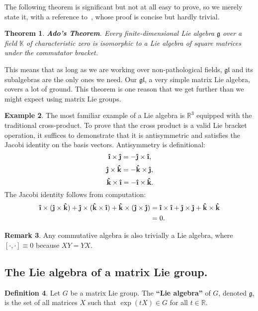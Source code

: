 \documentclass[12pt]{article}
\newcommand{\R}{\mathbb{R}}
\newcommand{\K}{\mathbb{K}}
\newcommand{\g}{\mathfrak{g}}
\newcommand{\gl}{\mathfrak{gl}}
\newcommand{\ihat}{\boldsymbol{\hat{\textbf{\i}}}}
\newcommand{\jhat}{\boldsymbol{\hat{\textbf{\j}}}}
\newcommand{\khat}{\boldsymbol{\hat{\textbf{k}}}}
\newtheorem{them}{Theorem}[section]
\theoremstyle{definition}
\theoremstyle{definition}
\theoremstyle{definition}
\theoremstyle{definition}
\newtheorem{rmk}[them]{Remark}
\theoremstyle{definition}
\newtheorem{defn}[them]{Definition}
\theoremstyle{definition}
\newtheorem{ex}[them]{Example}
\theoremstyle{definition}
\theoremstyle{definition}
\begin{document}
\par{The following theorem is significant but
not at all easy to prove, so we merely
state it, with a reference to~\cite{Neretin},
whose proof is concise but hardly trivial.}

\begin{them}\label{them:ado}
\textbf{Ado’s Theorem}.
Every finite-dimensional Lie algebra $\g$
over a field $\K$ of characteristic zero is
isomorphic to a Lie algebra of square matrices under
the commutator bracket.
\end{them}

\par{This means that as long as we are working
over non-pathological fields, $\gl$ and its
subalgebras are the only ones we need. Our $\gl$,
a very simple matrix Lie algebra, covers a lot of
ground. This theorem is one reason that we get
further than we might expect using matrix Lie
groups.}

\begin{ex}
The most familiar example of a Lie algebra is
$\R^3$ equipped with the traditional
cross-product. To prove that the cross product is
a valid Lie bracket operation, it suffices to
demonstrate that it is antisymmetric and satisfies
the Jacobi identity on the basis vectors.
Antisymmetry is definitional:
\[\ihat \times \jhat = - \jhat \times \ihat,\]
\[\jhat \times \khat = - \khat \times \jhat,\]
\[\khat \times \ihat = - \ihat \times \khat.\] 
The Jacobi identity follows from computation: 
\[
\begin{aligned}
    \ihat \times (\jhat \times \khat) + \jhat
    \times (\khat \times \ihat) + \khat \times
    (\jhat \times \jhat)
    & = \ihat \times \ihat +
    \jhat \times \jhat + \khat \times \khat \\ 
    & = 0.
\end{aligned}
\]
\end{ex}

\begin{rmk}
Any commutative algebra is also trivially a Lie
algebra, where $[\cdot,\cdot] \equiv 0$ because
$XY = YX$.
\end{rmk}

\subsection{The Lie algebra of a matrix Lie group.}

\begin{defn}
Let $G$ be a matrix Lie group. The \textbf{“Lie
algebra”} of $G$, denoted $\g$, is the set of all
matrices $X$ such that $\exp(tX) \in G$ for all $t
\in \R$.
\end{defn}
\end{document}
